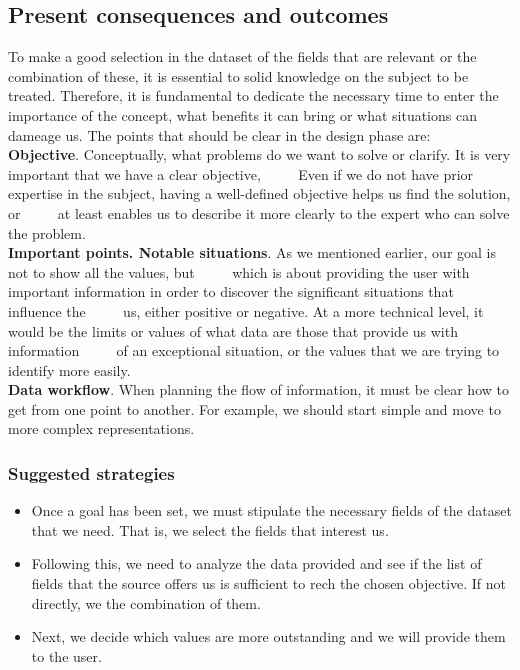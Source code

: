 \subsection{Present consequences and outcomes}

To make a good selection in the dataset of the fields that are relevant or the combination of these, it is essential to
solid knowledge on the subject to be treated. Therefore, it is fundamental to dedicate the necessary time to enter the
importance of the concept, what benefits it can bring or what situations can dameage us.
The points that should be clear in the design phase are: \\

\textbf{Objective}. Conceptually, what problems do we want to solve or clarify. It is very important that we have a clear objective,
     Even if we do not have prior expertise in the subject, having a well-defined objective helps us find the solution, or
     at least enables us to describe it more clearly to the expert who can solve the problem. \\

\textbf{Important points. Notable situations}. As we mentioned earlier, our goal is not to show all the values, but
     which is about providing the user with important information in order to discover the significant situations that influence the
     us, either positive or negative. At a more technical level, it would be the limits or values of what data are those that provide us with information
     of an exceptional situation, or the values that we are trying to identify more easily. \\

\textbf{Data workflow}. When planning the flow of information, it must be clear how to get from one point to another. For example, 
we should start simple and move to more complex representations.

\subsubsection*{Suggested strategies} 

\begin{itemize}
    \item Once a goal has been set, we must stipulate the necessary fields of the dataset that we need. That is, we select the fields that interest us. 
    \item Following this, we need to analyze the data provided and see if the list of fields that the source offers us is sufficient to rech the chosen objective.
    If not directly, we the combination of them.
    \item Next, we decide which values are more outstanding and we will provide them to the user.
\end{itemize}

